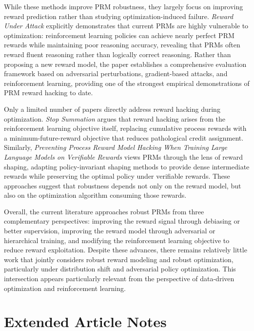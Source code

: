 \documentclass[11pt]{article}
\begin{document}
While these methods improve PRM robustness, they largely focus on improving reward prediction rather than studying optimization-induced failure. \emph{Reward Under Attack} explicitly demonstrates that current PRMs are highly vulnerable to optimization: reinforcement learning policies can achieve nearly perfect PRM rewards while maintaining poor reasoning accuracy, revealing that PRMs often reward fluent reasoning rather than logically correct reasoning. Rather than proposing a new reward model, the paper establishes a comprehensive evaluation framework based on adversarial perturbations, gradient-based attacks, and reinforcement learning, providing one of the strongest empirical demonstrations of PRM reward hacking to date. 

Only a limited number of papers directly address reward hacking during optimization. \emph{Stop Summation} argues that reward hacking arises from the reinforcement learning objective itself, replacing cumulative process rewards with a minimum-future-reward objective that reduces pathological credit assignment. Similarly, \emph{Preventing Process Reward Model Hacking When Training Large Language Models on Verifiable Rewards} views PRMs through the lens of reward shaping, adapting policy-invariant shaping methods to provide dense intermediate rewards while preserving the optimal policy under verifiable rewards. These approaches suggest that robustness depends not only on the reward model, but also on the optimization algorithm consuming those rewards. 

Overall, the current literature approaches robust PRMs from three complementary perspectives: improving the reward signal through debiasing or better supervision, improving the reward model through adversarial or hierarchical training, and modifying the reinforcement learning objective to reduce reward exploitation. Despite these advances, there remains relatively little work that jointly considers robust reward modeling and robust optimization, particularly under distribution shift and adversarial policy optimization. This intersection appears particularly relevant from the perspective of data-driven optimization and reinforcement learning. 


\section{Extended Article Notes}
\end{document}
